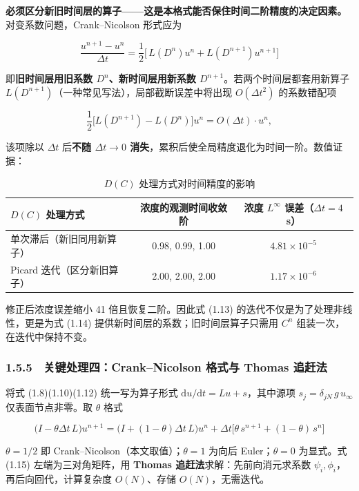 \documentclass[12pt,a4paper]{ctexart}
\begin{document}
\textbf{必须区分新旧时间层的算子——这是本格式能否保住时间二阶精度的决定因素。} 对变系数问题，Crank–Nicolson 形式应为

\begin{equation}
\frac{u^{n+1}-u^{n}}{\Delta t}
=\frac{1}{2}\Big[\,L\!\left(D^{n}\right)u^{n}+L\!\left(D^{n+1}\right)u^{n+1}\Big]
\tag{1.14}
\end{equation}

即\textbf{旧时间层用旧系数 $D^n$、新时间层用新系数 $D^{n+1}$}。若两个时间层都套用新算子 $L(D^{n+1})$（一种常见写法），局部截断误差中将出现 $O(\Delta t^{2})$ 的系数错配项

\[
\frac{1}{2}\Big[L(D^{n+1})-L(D^{n})\Big]u^{n}=O\!\left(\Delta t\right)\cdot u^{n},
\]

该项除以 $\Delta t$ 后\textbf{不随 $\Delta t\to0$ 消失}，累积后使全局精度退化为时间一阶。数值证据：

\begin{table}[H]
\centering
\caption{$D(C)$ 处理方式对时间精度的影响}
\begin{tabular}{lcc}
\toprule
$D(C)$ 处理方式 & 浓度的观测时间收敛阶 & 浓度 $L^\infty$ 误差（$\Delta t=4$ s） \\
\midrule
单次滞后（新旧同用新算子） & 0.98, 0.99, 1.00 & $4.81\times10^{-5}$ \\
Picard 迭代（区分新旧算子） & 2.00, 2.00, 2.00 & $1.17\times10^{-6}$ \\
\bottomrule
\end{tabular}
\end{table}

修正后浓度误差缩小 41 倍且恢复二阶。因此式 (1.13) 的迭代不仅是为了处理非线性，更是为式 (1.14) 提供新时间层的系数；旧时间层算子只需用 $C^n$ 组装一次，在迭代中保持不变。

\subsubsection*{1.5.5　关键处理四：Crank–Nicolson 格式与 Thomas 追赶法}

将式 (1.8)(1.10)(1.12) 统一写为算子形式 $\mathrm{d}u/\mathrm{d}t=L u+s$，其中源项 $s_j=\delta_{jN}\,g\,u_\infty$ 仅表面节点非零。取 $\theta$ 格式

\begin{equation}
\big(I-\theta\Delta t\,L\big)u^{n+1}=\big(I+(1-\theta)\Delta t\,L\big)u^{n}
+\Delta t\big[\theta\,s^{n+1}+(1-\theta)\,s^{n}\big]
\tag{1.15}
\end{equation}

$\theta=1/2$ 即 Crank–Nicolson（本文取值）；$\theta=1$ 为向后 Euler；$\theta=0$ 为显式。式 (1.15) 左端为三对角矩阵，用 \textbf{Thomas 追赶法}求解：先前向消元求系数 $\psi_i,\phi_i$，再后向回代，计算复杂度 $O(N)$、存储 $O(N)$，无需迭代。
\end{document}
